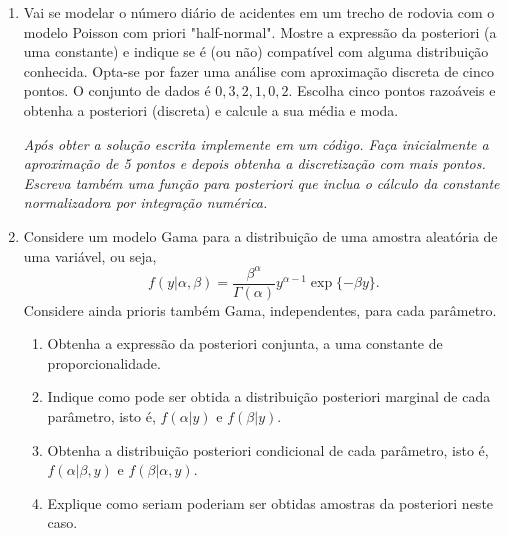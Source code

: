\documentclass[11pt,a4]{article}\usepackage[]{graphicx}\usepackage[]{xcolor}
\begin{document}
\begin{enumerate}
\begin{extra}
{\it Implemente as abordagens mencionadas. (sugestão: implementar ao menos a aproximação gaussiana e MCMC).}
\end{extra}

\begin{solucao}

\end{solucao}


\item Vai se modelar o número diário de acidentes em um trecho de rodovia com o modelo Poisson
  com priori "half-normal". Mostre a expressão da posteriori (a uma constante) e indique se é (ou não) compatível com alguma distribuição conhecida.
  Opta-se por fazer uma análise com aproximação discreta de cinco pontos.
  O conjunto de dados é $0, 3, 2, 1, 0, 2$.
  Escolha cinco pontos razoáveis e obtenha a posteriori (discreta) e calcule a sua média e moda.

\begin{extra}
  {\it Após obter a solução escrita implemente em um código. Faça inicialmente a aproximação de 5 pontos e depois obtenha a discretização com mais pontos.
  Escreva também uma função para posteriori que inclua o cálculo da constante normalizadora por integração numérica. }
\end{extra}
  
\begin{solucao}


\end{solucao}

  
\item Considere um modelo Gama para a distribuição de uma amostra aleatória de uma variável, ou seja,
  \[ f(y|\alpha, \beta) = \frac{\beta^\alpha}{\Gamma(\alpha)} y^{\alpha-1} \exp\{-\beta y\} . \]
Considere ainda prioris também Gama, independentes, para cada parâmetro.
\begin{enumerate}
  \item Obtenha a expressão da posteriori conjunta, a uma constante de proporcionalidade.
  \item Indique como pode ser obtida a distribuição posteriori marginal de cada parâmetro, isto é, $f(\alpha|y)$ e $f(\beta|y)$. 
  \item Obtenha a distribuição posteriori condicional de cada parâmetro, isto é, $f(\alpha|\beta, y)$ e $f(\beta|\alpha, y)$. 
  \item Explique como seriam poderiam ser obtidas amostras da posteriori neste caso. %
\end{enumerate}


\end{enumerate}
\end{document}
